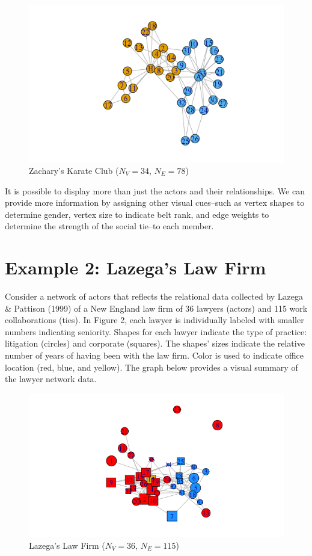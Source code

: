 \documentclass[12pt,twoside]{amherstthesis}
\begin{document}
  \begin{figure}[htbp]
  \centering
  \includegraphics{figure/01karateplot.png}
  \caption{Zachary's Karate Club (\(N_V = 34\), \(N_E = 78\))}
  \end{figure}
  
  It is possible to display more than just the actors and their
  relationships. We can provide more information by assigning other visual
  cues--such as vertex shapes to determine gender, vertex size to indicate
  belt rank, and edge weights to determine the strength of the social
  tie--to each member.
  
  \section{Example 2: Lazega's Law Firm}\label{example-2-lazegas-law-firm}
  
  Consider a network of actors that reflects the relational data collected
  by Lazega \& Pattison (1999) of a New England law firm of 36 lawyers
  (actors) and 115 work collaborations (ties). In Figure 2, each lawyer is
  individually labeled with smaller numbers indicating seniority. Shapes
  for each lawyer indicate the type of practice: litigation (circles) and
  corporate (squares). The shapes' sizes indicate the relative number of
  years of having been with the law firm. Color is used to indicate office
  location (red, blue, and yellow). The graph below provides a visual
  summary of the lawyer network data.
  
  \begin{figure}[htbp]
  \centering
  \includegraphics{figure/02lawyerplot.png}
  \caption{Lazega's Law Firm (\(N_V = 36\), \(N_E = 115\))}
  \end{figure}
  
\end{document}
